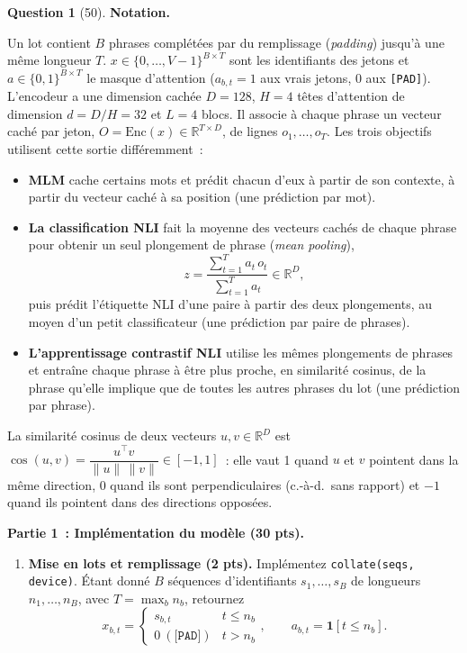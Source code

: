 \documentclass[12pt]{article}
\theoremstyle{definition}
\newtheorem{exercise}{Question}%
\begin{document}
\begin{exercise}[50]
\textbf{Notation.}

Un lot contient $B$ phrases complétées par du remplissage (\emph{padding}) jusqu'à une même longueur $T$.
$x \in \{0, \dots, V-1\}^{B \times T}$ sont les identifiants des jetons et $a \in \{0, 1\}^{B \times T}$ le masque
d'attention ($a_{b,t} = 1$ aux vrais jetons, $0$ aux \texttt{[PAD]}). L'encodeur a une dimension cachée $D = 128$,
$H = 4$ têtes d'attention de dimension $d = D/H = 32$ et $L = 4$ blocs. Il associe à chaque phrase un vecteur caché
par jeton, $O = \mathrm{Enc}(x) \in \mathbb{R}^{T \times D}$, de lignes $o_1, \dots, o_T$. Les trois objectifs
utilisent cette sortie différemment~:
\begin{itemize}
  \item \textbf{MLM} cache certains mots et prédit chacun d'eux à partir de son contexte, à partir du vecteur caché
        à sa position (une prédiction par mot).
  \item \textbf{La classification NLI} fait la moyenne des vecteurs cachés de chaque phrase pour obtenir un seul
        plongement de phrase (\emph{mean pooling}),
        \[
          z = \frac{\sum_{t=1}^{T} a_t\, o_t}{\sum_{t=1}^{T} a_t} \in \mathbb{R}^{D},
        \]
        puis prédit l'étiquette NLI d'une paire à partir des deux plongements, au moyen d'un petit classificateur
        (une prédiction par paire de phrases).
  \item \textbf{L'apprentissage contrastif NLI} utilise les mêmes plongements de phrases et entraîne chaque phrase à
        être plus proche, en similarité cosinus, de la phrase qu'elle implique que de toutes les autres phrases du
        lot (une prédiction par phrase).
\end{itemize}
La similarité cosinus de deux vecteurs $u, v \in \mathbb{R}^D$ est
$\cos(u, v) = \dfrac{u^\top v}{\|u\|\,\|v\|} \in [-1, 1]$~: elle vaut 1 quand $u$ et $v$ pointent dans la même
direction, 0 quand ils sont perpendiculaires (c.-à-d.\ sans rapport) et $-1$ quand ils pointent dans des directions opposées.

\textbf{Partie 1~: Implémentation du modèle (30 pts).}

\begin{enumerate}
  \item \textbf{Mise en lots et remplissage (2 pts).} Implémentez \texttt{collate(seqs, device)}. Étant donné $B$
  séquences d'identifiants $s_1, \dots, s_B$ de longueurs $n_1, \dots, n_B$, avec $T = \max_b n_b$, retournez
  \[
    x_{b,t} = \begin{cases} s_{b,t} & t \le n_b \\ 0 \ (\texttt{[PAD]}) & t > n_b \end{cases}, \qquad
    a_{b,t} = \mathbf{1}[t \le n_b].
  \]


\end{enumerate}
\end{exercise}
\end{document}
